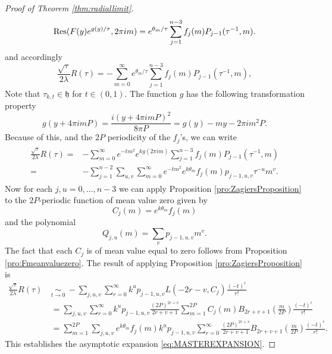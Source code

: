 \begin{proof}[Proof of Theorem \ref{thm:radiallimit}]
\begin{equation}
\operatorname{Res}(F(y)e^{g(y)/\tau}, 2\pi im)=  e^{\theta_m/\tau} \sum_{j=1}^{n-3} f_j(m) P_{j-1}(\tau^{-1},m).
\end{equation}
and accordingly
\begin{equation}
\frac{\sqrt{\tau}}{2\lambda}R(\tau)=-\sum_{m =0}^\infty  e^{\theta_m/\tau} \sum_{j=1}^{n-3} f_j(m) P_{j-1}(\tau^{-1},m),
\end{equation}
Note that $\tau_{k,t} \in \mathfrak{h}$ for $t\in (0,1)$.
The function $g$ has the following transformation property\begin{equation}g(y+4\pi i m P)=\frac{i(y+4\pi i mP)^2}{8\pi P}=g(y)-my- 2 \pi i  m^2 P.\end{equation} Because of this, and the $2P$ periodicity of the $f_j$'s, we can write
\begin{align} \begin{split}  \label{MELLEMREGNING}
\frac{\sqrt{\tau}}{2\lambda}R(\tau)= &-\sum_{m=0}^{\infty} e^{- t m^2} e^{kg(2\pi i m)} \sum_{j=1}^{n-3} f_j(m) P_{j-1}(\tau^{-1},m)
\\ = &- \sum_{j=1}^{n-2} \sum_{u,v} \sum_{m=0}^{\infty} e^{- t  m^2} e^{k\theta_m}  f_j(m) p_{j-1,u,v} \tau^{-u}m^v.
\end{split} 
\end{align}
Now for each $j,u=0,...,n-3$ we can apply Proposition \ref{pro:ZagiersProposition} to the $2P$-periodic function of mean value zero given by
\begin{equation}
C_j(m)=e^{k\theta_m}  f_j(m)
\end{equation}
and the polynomial
\begin{equation}
Q_{j,u}(m)= \sum_v p_{j-1,u,v} m^v.
\end{equation}
The fact that each $C_j$ is of mean value equal to zero follows from Proposition \ref{pro:Fmeanvaluezero}. The result of applying Proposition \ref{pro:ZagiersProposition} is
\begin{align}
\frac{\sqrt{\tau}}{2\lambda}R(\tau) \ & \underset{t \rightarrow 0}{\sim } \ -\sum_{j,u,v} \sum_{r=0}^{\infty}  k^up_{j-1,u,v} L(-2r-v,C_j) \frac{(-t)^r}{r!}
\\ &= \sum_{j,u,v} \sum_{r=0}^{\infty}  k^up_{j-1,u,v} \frac{(2P)^{2r+v}}{2r+v+1} \sum_{m=1}^{2P} C_j(m) B_{2r+v+1}\left(\frac{m}{2P}\right) \frac{(-t)^r}{r!}
\\ &= \sum_{m=1}^{2P} \sum_{j,u,v} e^{k\theta_m}  f_j(m) k^up_{j-1,u,v}  \sum_{r=0}^{\infty}  \frac{(2P)^{2r+v}}{2r+v+1}  B_{2r+v+1}\left(\frac{m}{2P}\right) \frac{(-t)^r}{r!}.
\end{align}
This establishes the asymptotic expansion \eqref{eq:MASTEREXPANSION}.


\end{proof}
